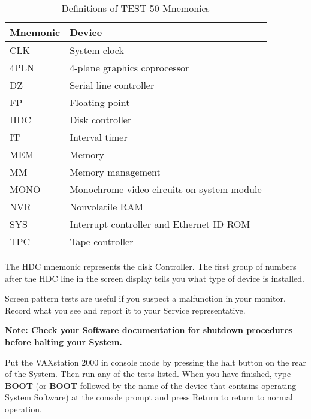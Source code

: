 \documentclass{dec}
\begin{document}
\begin{table}[H]
\label{table:2}
\caption{Definitions of TEST 50 Mnemonics}
\begin{tabularx}{\textwidth}{l l}
\hline
\textbf{Mnemonic} & \textbf{Device}\\
\hline
CLK & System clock \\
4PLN & 4-plane graphics coprocessor \\
DZ & Serial line controller \\
FP & Floating point \\
HDC & Disk controller \\
IT & Interval timer \\
MEM & Memory \\
MM & Memory management \\
MONO & Monochrome video circuits on system module \\
NVR & Nonvolatile RAM \\
SYS & Interrupt controller and Ethernet ID ROM \\
TPC & Tape controller \\
\hline
\end{tabularx}
\end{table}

The HDC mnemonic represents the disk Controller. The first group of numbers
after the HDC line in the screen display teils you what type of device is
installed.


Screen pattern tests are useful if you suspect a malfunction in your monitor.
Record what you see and report it to your Service representative.

\textbf{Note: Check your Software documentation for shutdown procedures before halting your System.}

Put the VAXstation 2000 in console mode by pressing the halt button on the
rear of the System. Then run any of the tests listed. When you have finished,
type \textbf{BOOT} (or \textbf{BOOT} followed by the name of the device that contains
operating System Software) at the console prompt and press Return to return
to normal operation.

\newpage
\end{document}
